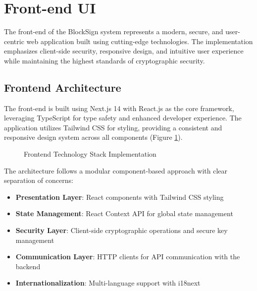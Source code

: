 \section{Front-end UI}
The front-end of the BlockSign system represents a modern, secure, and user-centric web application built using cutting-edge technologies. The implementation emphasizes client-side security, responsive design, and intuitive user experience while maintaining the highest standards of cryptographic security.

\subsection{Frontend Architecture}
The front-end is built using Next.js 14 with React.js as the core framework, leveraging TypeScript for type safety and enhanced developer experience. The application utilizes Tailwind CSS for styling, providing a consistent and responsive design system across all components (Figure \ref{frontend-stack}).

\begin{figure}[H]
    \centering
    \caption{Frontend Technology Stack Implementation}
    \label{frontend-stack}
\end{figure}

The architecture follows a modular component-based approach with clear separation of concerns:

\begin{itemize}
    \item \textbf{Presentation Layer}: React components with Tailwind CSS styling
    \item \textbf{State Management}: React Context API for global state management
    \item \textbf{Security Layer}: Client-side cryptographic operations and secure key management
    \item \textbf{Communication Layer}: HTTP clients for API communication with the backend
    \item \textbf{Internationalization}: Multi-language support with i18next
\end{itemize}

